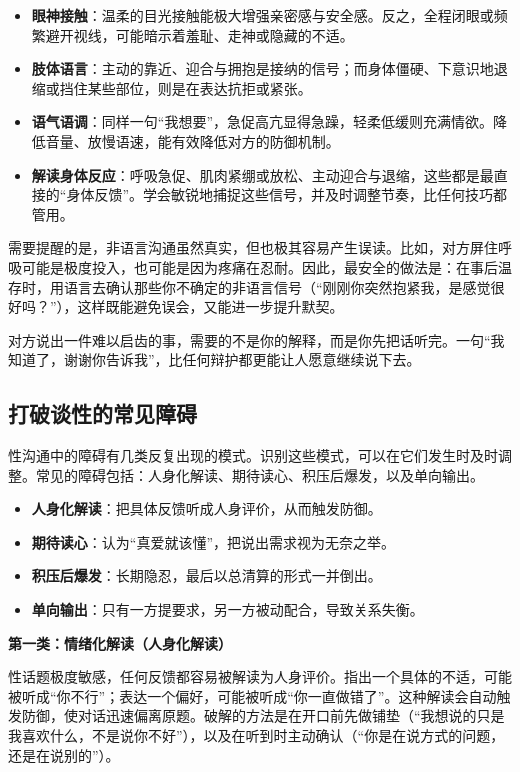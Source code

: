 \documentclass[12pt,UTF8]{ctexbook}
\begin{document}
\begin{itemize}
\item \textbf{眼神接触}：温柔的目光接触能极大增强亲密感与安全感。反之，全程闭眼或频繁避开视线，可能暗示着羞耻、走神或隐藏的不适。
\item \textbf{肢体语言}：主动的靠近、迎合与拥抱是接纳的信号；而身体僵硬、下意识地退缩或挡住某些部位，则是在表达抗拒或紧张。
\item \textbf{语气语调}：同样一句“我想要”，急促高亢显得急躁，轻柔低缓则充满情欲。降低音量、放慢语速，能有效降低对方的防御机制。
\item \textbf{解读身体反应}：呼吸急促、肌肉紧绷或放松、主动迎合与退缩，这些都是最直接的“身体反馈”。学会敏锐地捕捉这些信号，并及时调整节奏，比任何技巧都管用。
\end{itemize}

需要提醒的是，非语言沟通虽然真实，但也极其容易产生误读。比如，对方屏住呼吸可能是极度投入，也可能是因为疼痛在忍耐。因此，最安全的做法是：在事后温存时，用语言去确认那些你不确定的非语言信号（“刚刚你突然抱紧我，是感觉很好吗？”），这样既能避免误会，又能进一步提升默契。

\begin{tcolorbox}[colback=pink!5!white,colframe=red!50!black,title=贴心小叮咛]
对方说出一件难以启齿的事，需要的不是你的解释，而是你先把话听完。一句“我知道了，谢谢你告诉我”，比任何辩护都更能让人愿意继续说下去。
\end{tcolorbox}

\subsection{打破谈性的常见障碍}

性沟通中的障碍有几类反复出现的模式。识别这些模式，可以在它们发生时及时调整。常见的障碍包括：人身化解读、期待读心、积压后爆发，以及单向输出。

\begin{itemize}
\item \textbf{人身化解读}：把具体反馈听成人身评价，从而触发防御。
\item \textbf{期待读心}：认为“真爱就该懂”，把说出需求视为无奈之举。
\item \textbf{积压后爆发}：长期隐忍，最后以总清算的形式一并倒出。
\item \textbf{单向输出}：只有一方提要求，另一方被动配合，导致关系失衡。
\end{itemize}

\textbf{第一类：情绪化解读（人身化解读）}

性话题极度敏感，任何反馈都容易被解读为人身评价。指出一个具体的不适，可能被听成“你不行”；表达一个偏好，可能被听成“你一直做错了”。这种解读会自动触发防御，使对话迅速偏离原题。破解的方法是在开口前先做铺垫（“我想说的只是我喜欢什么，不是说你不好”），以及在听到时主动确认（“你是在说方式的问题，还是在说别的”）。
\end{document}
